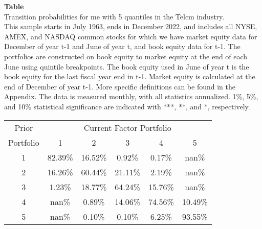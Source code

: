 \begin{table*}[ht!]
\raggedright
{}
\label{tab: transition_probs_me_Telcm_with_5_quantiles}
\textbf{Table \thetable} \\
Transition probabilities for me with 5 quantiles in the Telcm industry. \\
\hspace*{1em}This sample starts in July 1963, ends in December 2022, and includes all NYSE, AMEX, and NASDAQ common stocks for which we have market equity data for December of year t-1 and June of year t, and book equity data for t-1. The portfolios are constructed on book equity to market equity at the end of each June using quintile breakpoints.  The book equity used in June of year t is the book equity for the last fiscal year end in t-1.  Market equity is calculated at the end of December of year t-1.  More specific definitions can be found in the Appendix.  The data is measured monthly, with all statistics annualized.  1\%, 5\%, and 10\% statistical significance are indicated with ***, **, and *, respectively. \\
\vspace{0.5em}
\centering
\begin{adjustbox}{max width=\textwidth}
\begin{tabular}{@{}cccccc@{}}
\toprule
Prior & \multicolumn{5}{c}{Current Factor Portfolio} \\
Portfolio & 1 & 2 & 3 & 4 & 5 \\
\midrule
1 & 82.39\% & 16.52\% & 0.92\% & 0.17\% & nan\% \\
2 & 16.26\% & 60.44\% & 21.11\% & 2.19\% & nan\% \\
3 & 1.23\% & 18.77\% & 64.24\% & 15.76\% & nan\% \\
4 & nan\% & 0.89\% & 14.06\% & 74.56\% & 10.49\% \\
5 & nan\% & 0.10\% & 0.10\% & 6.25\% & 93.55\% \\
\bottomrule
\end{tabular}
\end{adjustbox}
\end{table*}